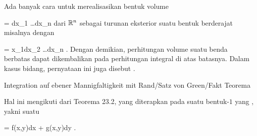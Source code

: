 Ada banyak cara untuk merealisasikan bentuk volume

\mavergleichskette
{\vergleichskette
{ \tau
}
{ = }{ dx_1 \wedge \ldots \wedge dx_n
}
{  }{
}
{    }{
}
{   }{
}
}
{}{}{}
dari ${\mathbb R}^n$ sebagai turunan eksterior suatu bentuk berderajat
 misalnya dengan

\mavergleichskette
{\vergleichskette
{  \omega
}
{ = }{ x_1dx_2 \wedge \ldots \wedge dx_n
}
{  }{
}
{    }{
}
{   }{
}
}
{}{}{.}
Dengan demikian, perhitungan volume suatu benda berbatas dapat dikembalikan pada perhitungan integral di atas batasnya. Dalam kasus bidang, pernyataan ini juga disebut  {.}



{Integration auf ebener Mannigfaltigkeit mit Rand/Satz von Green/Fakt}
{Teorema}
{}
{

\faktzusatz {}
\faktzusatz {}

}
{

Hal ini mengikuti dari
Teorema 23.2,
yang diterapkan pada suatu bentuk-$1$ yang
,
yakni suatu

\mavergleichskette
{\vergleichskette
{ \omega
}
{ = }{ f(x,y)dx + g(x,y)dy
}
{  }{
}
{    }{
}
{   }{
}
}
{}{}{.}

}



